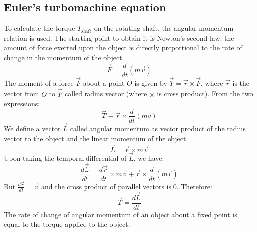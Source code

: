 \subsection{Euler's turbomachine equation}
To calculate the torque $T_{\textrm{shaft}}$ on the rotating shaft, the angular momentum relation is used. The starting point to obtain it is Newton's second law: the amount of force exerted upon the object is directly proportional to the rate of change in the momentum of the object.
\begin{equation}
  \vec{F} = \frac{d}{dt}(m\vec{v})
\end{equation}
The moment of a force $\vec{F}$ about a point $O$ is given by $\vec{T} = \vec{r}\times\vec{F}$, where $\vec{r}$ is the vector from $O$ to $\vec{F}$ called radius vector (where $\times$ is cross product). From the two expressions:
\begin{equation}
  \vec{T} = \vec{r} \times \frac{d}{dt} (mv)
\end{equation}
We define a vector $\vec{L}$ called angular momentum as vector product of the radius vector to the object and the linear momentum of the object.
\begin{equation}
  \vec{L} = \vec{r} \times m \vec{v}
\end{equation}
Upon taking the temporal differential of $\vec{L}$, we have:
\begin{equation}
  \frac{d\vec{L}}{dt} = \frac{d\vec{r}}{dt} \times m\vec{v} + \vec{r} \times \frac{d}{dt}(m\vec{v})
\end{equation}
But $ \frac{d\vec{r}}{dt} = \vec{v}$ and the cross product of parallel vectors is 0. Therefore:
\begin{equation}
  \vec{T} = \frac{d\vec{L}}{dt}
\end{equation}
The rate of change of angular momentum of an object about a fixed point is equal to the torque applied to the object.
